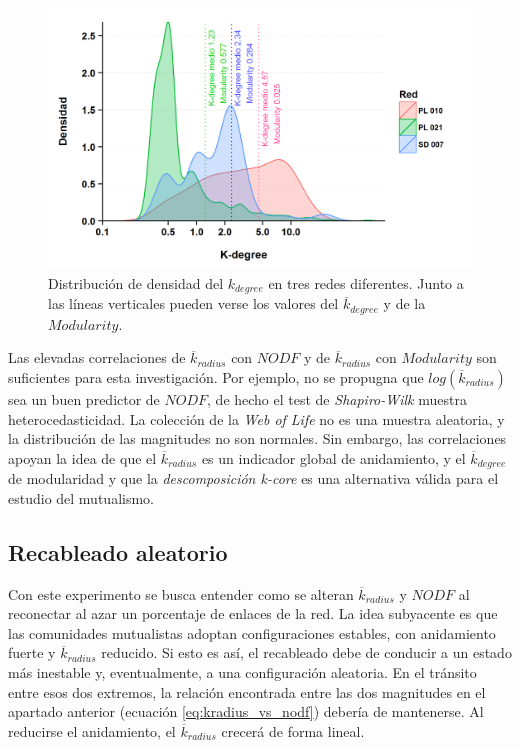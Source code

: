 \begin{figure}[h!]
\centering
\includegraphics[scale=0.85]{ESTATICA_density_plots.png}
\caption {Distribución de densidad del $k_{degree}$ en tres redes diferentes. Junto a las líneas verticales pueden verse los valores del $\overline {k}_{degree}$ y de la $Modularity$.}
\label{fig:ESTATICA_density_plots}
\end{figure}

Las elevadas correlaciones de $\overline {k}_{radius}$ con $NODF$ y de $\overline {k}_{radius}$ con $Modularity$ son suficientes para esta investigación. Por ejemplo, no se propugna que $log(\overline {k}_{radius})$ sea un buen predictor de $NODF$, de hecho el test de \textit{Shapiro-Wilk} muestra heterocedasticidad. La colección de la \textit{Web of Life} no es una muestra aleatoria, y la distribución de las magnitudes no son normales. Sin embargo, las correlaciones apoyan la idea de que el $\overline {k}_{radius}$ es un indicador global de anidamiento, y el $\overline {k}_{degree}$ de modularidad y que la \textit{descomposición k-core} es una alternativa válida para el estudio del mutualismo.

\subsection{Recableado aleatorio}

Con este experimento se busca entender como se alteran $\overline {k}_{radius}$ y $NODF$ al reconectar al azar un porcentaje de enlaces de la red. La idea subyacente es que las comunidades mutualistas adoptan configuraciones estables, con anidamiento fuerte y $\overline {k}_{radius}$ reducido. Si esto es así, el recableado debe de conducir a un estado más inestable y, eventualmente, a una configuración aleatoria. En el tránsito entre esos dos extremos, la relación encontrada entre las dos magnitudes en el apartado anterior (ecuación \ref{eq:kradius_vs_nodf}) debería de mantenerse. Al reducirse el anidamiento, el $\overline {k}_{radius}$ crecerá de forma lineal.

